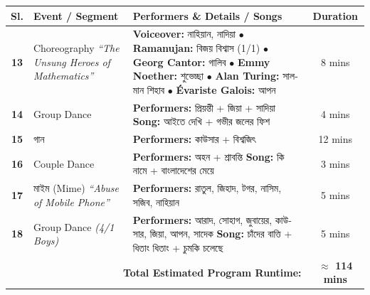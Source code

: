\documentclass[11pt,a4paper]{article}
\begin{document}
\begin{table}[htbp]
\centering
\small
\renewcommand{\arraystretch}{1.35}
\begin{tabularx}{\textwidth}{c p{3.2cm} X c}
\toprule
\textbf{Sl.} & \textbf{Event / Segment} & \textbf{Performers \& Details / Songs} & \textbf{Duration} \\
\midrule

\textbf{13} & 
Choreography \newline
\textit{``The Unsung Heroes of Mathematics''} & 
\textbf{Voiceover:} \textbengali{নাহিয়ান, নাদিয়া} \newline
$\bullet$ \textbf{Ramanujan:} \textbengali{বিজয় বিশ্বাস} (1/1) \newline
$\bullet$ \textbf{Georg Cantor:} \textbengali{গালিব} \newline
$\bullet$ \textbf{Emmy Noether:} \textbengali{শুভেচ্ছা} \newline
$\bullet$ \textbf{Alan Turing:} \textbengali{সালমান শিহাব} \newline
$\bullet$ \textbf{Évariste Galois:} \textbengali{আপন} & 
8 mins \\

\textbf{14} & 
Group Dance & 
\textbf{Performers:} \textbengali{প্রিয়ন্তী + জিয়া + সাদিয়া} \newline
\textbf{Song:} \textbengali{আইতে দেখি + গভীর জলের ফিশ} & 
4 mins \\

\textbf{15} & 
\textbengali{গান} & 
\textbf{Performers:} \textbengali{কাউসার + বিশ্বজিৎ} & 
12 mins \\

\textbf{16} & 
Couple Dance & 
\textbf{Performers:} \textbengali{অহন + শ্রাবন্তি}\newline
\textbf{Song:} \textbengali{কি নামে + বাংলাদেশের মেয়ে} & 
3 mins \\

\textbf{17} & 
\textbengali{মাইম} (Mime) \newline
\textit{``Abuse of Mobile Phone''} & 
\textbf{Performers:} \textbengali{রাতুল, জিহাদ, টগর, নাসিম, সজিব, নাহিয়ান} & 
5 mins \\

\textbf{18} & 
Group Dance \newline
\textit{(4/1 Boys)} & 
\textbf{Performers:} \textbengali{ আরাদ, সোহাগ, জুবায়ের, কাউসার, জিয়া, আপন, সাদেক} \newline
\textbf{Song:} \textbengali{চাঁদের বাত্তি + ধিতাং ধিতাং + চুমকি চলেছে} & 
5 mins \\

\midrule
\multicolumn{3}{r}{\textbf{Total Estimated Program Runtime:}} & \textbf{$\approx$ 114 mins} \\
\bottomrule
\end{tabularx}
\end{table}
\end{document}
